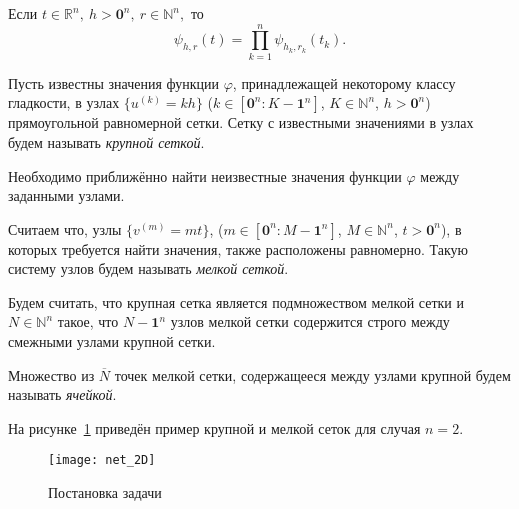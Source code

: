 Если $t\in\mathbb{R}^n,\  h>\mathbf{0}^n,\ r\in\mathbb{N}^n,$ то
\begin{equation*}
  \psi_{h,r}(t)=\prod_{k=1}^n\psi_{h_k,r_k}(t_k).
\end{equation*}


Пусть известны значения  функции $\varphi$, принадлежащей некоторому классу гладкости, 
в  узлах $\{u^{(k)}=kh\}$ ($k\in [\mathbf{0}^n : K-\mathbf{1}^n]$, $K\in \mathbb{N}^n$,
$h>\mathbf{0}^n$) прямоугольной
равномерной сетки. 
Сетку с известными значениями в узлах будем называть \textit{крупной сеткой}.

Необходимо приближённо найти неизвестные значения
функции $\varphi$ между заданными узлами.

Считаем что, узлы
$ \{v^{(m)}=mt\}$,  ($m\in [\mathbf{0}^n : M-\mathbf{1}^n]$,
$M\in \mathbb{N}^n$, $t>\mathbf{0}^n$), 
в которых требуется найти значения, 
также расположены
равномерно.
Такую  систему узлов %
будем называть
\textit{мелкой сеткой}.

Будем считать, что крупная сетка является подмножеством мелкой сетки и
$N\in\mathbb{N}^n$ такое, что $N-\mathbf{1}^n$ узлов мелкой сетки содержится строго между
смежными узлами крупной сетки.

Множество из $\overline{N}$ точек мелкой сетки, содержащееся между узлами крупной будем называть
\textit{ячейкой}.

На рисунке~\ref{fig:net_common} приведён пример крупной и мелкой сеток
для случая $n=2$.
\begin{figure}[h!]
  \centering
  \texttt{[image: net\_2D]}
  \caption{Постановка задачи}
  \label{fig:net_common}
\end{figure}



